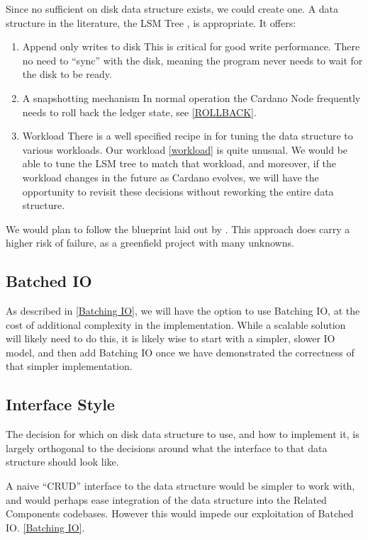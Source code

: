\documentclass[11pt,a4paper]{article}
\begin{document}
Since no sufficient on disk data structure exists, we could create one. A data
structure in the literature, the LSM Tree \cite{monkey}, is appropriate. It offers:

\begin{enumerate}
  \item Append only writes to disk
        This is critical for good write performance. There no need to ``sync''
        with the disk, meaning the program never needs to wait for the disk to be ready.
  \item A snapshotting mechanism
        In normal operation the Cardano Node frequently needs to roll back the
        ledger state, see \ref{ROLLBACK}.
  \item Workload
        There is a  well specified recipe in \cite{monkey} for tuning  the data
        structure to various workloads. Our workload \ref{workload} is quite unusual. We
        would be able to tune the LSM tree to match that workload, and moreover, if the
        workload changes in the future as Cardano evolves, we will have the opportunity
        to revisit these decisions without reworking the entire data structure.
\end{enumerate}

We would plan to follow the blueprint laid out by \cite{monkey}. This approach
does carry a higher risk of failure, as a greenfield project with many unknowns.

\subsection{Batched IO}
As described in \ref{Batching IO}, we will have the option to use Batching IO,
at the cost of additional complexity in the implementation. While a scalable
solution will likely need to do this, it is likely wise to start with a simpler,
slower IO model, and then add Batching IO once we have demonstrated the
correctness of that simpler implementation.

\subsection{Interface Style}

The decision for which on disk data structure to use, and how to implement it,
is largely orthogonal to the decisions around what the interface to that data
structure should look like.

A naive ``CRUD'' interface to the data structure would be simpler to work with,
and would perhaps ease integration of the data structure into the Related Components
codebases. However this would impede our exploitation of Batched IO. \ref{Batching IO}.
\end{document}
